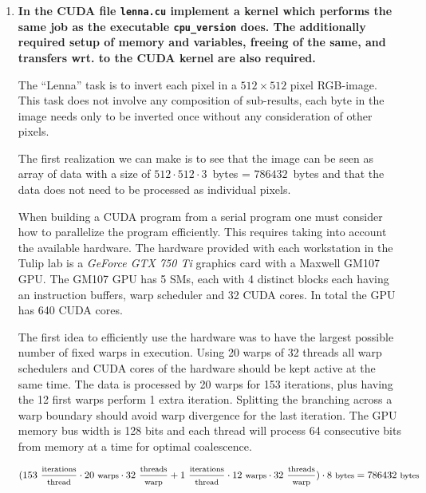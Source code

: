 \begin{enumerate}

\item \textbf{In the CUDA file \texttt{lenna.cu} implement a kernel which performs the same job as the executable \texttt{cpu\_version} does. The additionally required setup of memory and variables, freeing of the same, and transfers wrt. to the CUDA kernel are also required.}

The ``Lenna'' task is to invert each pixel in a $512 \times 512$ pixel RGB-image. This task does not involve any composition of sub-results, each byte in the image needs only to be inverted once without any consideration of other pixels.

The first realization we can make is to see that the image can be seen as array of data with a size of $512 \cdot 512 \cdot 3$~bytes = $786432$~bytes and that the data does not need to be processed as individual pixels.

When building a \ac{CUDA} program from a serial program one must consider how to parallelize the program efficiently. This requires taking into account the available hardware. The hardware provided with each workstation in the Tulip lab is a \textit{GeForce GTX 750 Ti} graphics card with a Maxwell GM107 \ac{GPU}. The GM107 \ac{GPU} has 5 \acp{SM}, each with 4 distinct blocks each having an instruction buffers, warp scheduler and 32 \ac{CUDA} cores. In total the \ac{GPU} has 640 \ac{CUDA} cores.

The first idea to efficiently use the hardware was to have the largest possible number of fixed warps in execution. Using 20 warps of 32 threads all warp schedulers and \ac{CUDA} cores of the hardware should be kept active at the same time. The data is processed by 20 warps for 153 iterations, plus having the 12 first warps perform 1 extra iteration. Splitting the branching across a warp boundary should avoid warp divergence for the last iteration. The \ac{GPU} memory bus width is 128 bits and each thread will process 64 consecutive bits from memory at a time for optimal coalescence.

\begin{displaymath}
(153~\frac{\text{\footnotesize iterations}}{\text{\footnotesize thread}} \cdot 20~\text{\footnotesize warps} \cdot 32~\frac{\text{\footnotesize threads}}{\text{\footnotesize warp}} + 1~\frac{\text{\footnotesize iterations}}{\text{\footnotesize thread}} \cdot 12~\text{\footnotesize warps} \cdot 32~\frac{\text{\footnotesize threads}}{\text{\footnotesize warp}}) \cdot 8~\text{\footnotesize bytes} = 786432~\text{\footnotesize bytes}
\end{displaymath}


\end{enumerate}
